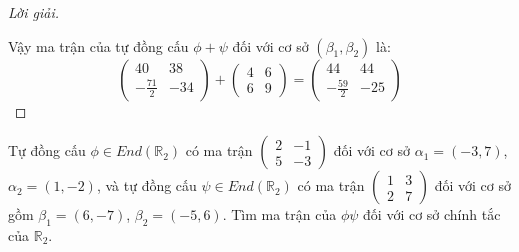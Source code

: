 \documentclass[class=linearalgebra,crop=false]{standalone}
\begin{document}
\begin{proof}[Lời giải]
\[    \]
    \par Vậy ma trận của tự đồng cấu $\phi + \psi$ đối với cơ sở $(\beta_{1}, \beta_{2})$ là:
    \[
        \begin{pmatrix}
            40            & 38  \\
            -\frac{71}{2} & -34
        \end{pmatrix}
        +
        \begin{pmatrix}
            4 & 6 \\
            6 & 9
        \end{pmatrix}
        =
        \begin{pmatrix}
            44            & 44  \\
            -\frac{59}{2} & -25
        \end{pmatrix}
    \]
\end{proof}

\begin{exercise}
    Tự đồng cấu $\phi\in End(\mathbb{R}_{2})$ có ma trận $\begin{pmatrix} 2 & -1 \\ 5 & -3 \end{pmatrix}$ đối với cơ sở $\alpha_{1} = (-3, 7)$, $\alpha_{2} = (1, -2)$, và tự đồng cấu $\psi\in End(\mathbb{R}_{2})$ có ma trận $\begin{pmatrix} 1 & 3 \\ 2 & 7 \end{pmatrix}$ đối với cơ sở gồm $\beta_{1} = (6, -7)$, $\beta_{2} = (-5, 6)$. Tìm ma trận của $\phi\psi$ đối với cơ sở chính tắc của $\mathbb{R}_{2}$.
\end{exercise}
\end{document}
